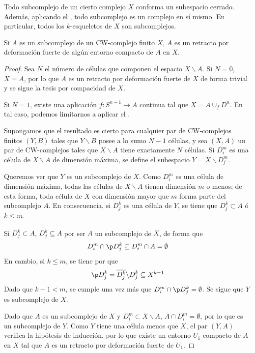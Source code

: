 Todo subcomplejo de un cierto complejo $X$ conforma un subespacio cerrado.
Además, aplicando el , todo subcomplejo es un complejo en sí
mismo. En particular, todos los $k$-esqueletos de $X$ son subcomplejos.

\begin{proposition}
Si $A$ es un subcomplejo de un CW-complejo finito $X$, $A$ es un retracto por
deformación fuerte de algún entorno compacto de $A$ en $X$.
\end{proposition}

\begin{proof}
Sea $N$ el número de células que componen el espacio $X\backslash A$. Si
$N=0$, $X=A$, por lo que $A$ es un retracto por deformación fuerte de $X$ de
forma trivial y se sigue la tesis por compacidad de $X$.

Si $N=1$, existe una aplicación $f\colon S^{n-1} \to A$ continua tal que
$X=A\cup_f D^n$. En tal caso, podemos limitarnos a aplicar el
.

Supongamos que el resultado es cierto para cualquier par de CW-complejos
finitos $(Y,B)$ tales que $Y\backslash B$ posee a lo sumo $N-1$ células, y sea
$(X,A)$ un par de CW-complejos tales que $X\backslash A$ tiene exactamente $N$
células. Si $D^m_i$ es una célula de $X\backslash A$ de dimensión máxima, se
define el subespacio $Y=X\backslash D^m_j$.

Queremos ver que $Y$ es un subcomplejo de $X$. Como $D^m_i$ es una célula de
dimensión máxima, todas las células de $X\backslash A$ tienen dimensión $m$ o
menos; de esta forma, toda célula de $X$ con dimensión mayor que $m$ forma
parte del subcomplejo $A$. En consecuencia, si $D^k_j$ es una célula de $Y$,
se tiene que $D^k_j \subset A$ ó $k \leq m$.

Si $D^k_j \subset A$, $\overline{D^k_j} \subseteq A$ por ser $A$ un
subcomplejo de $X$, de forma que
\[D^m_i \cap \p D^k_j \subseteq D^m_i \cap A=\emptyset\]
En cambio, si $k \leq m$, se tiene por  que
\[\p D^k_j=\overline{D^k_j}\backslash D^k_j\subseteq X^{k-1}\]
Dado que $k-1 < m$, se cumple una vez más que $D^m_i \cap \p D^k_j=\emptyset$.
Se sigue que $Y$ es subcomplejo de $X$.

Dado que $A$ es un subcomplejo de $X$ y $D^m_i \subset X\backslash A$, $A\cap
D^m_i=\emptyset$, por lo que es un subcomplejo de $Y$. Como $Y$ tiene una
célula menos que $X$, el par $(Y,A)$ verifica la hipótesis de inducción, por
lo que existe un entorno $U_1$ compacto de $A$ en $X$ tal que $A$ es un
retracto por deformación fuerte de $U_1$.


\end{proof}
